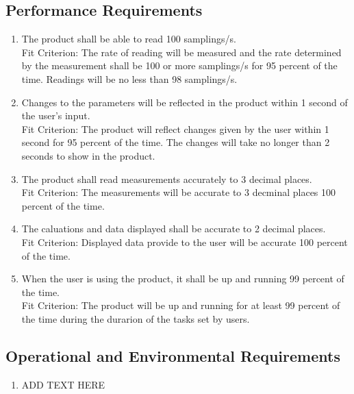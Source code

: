 \documentclass[12pt, titlepage]{article}
\begin{document}
\subsection{Performance Requirements}
\begin{adjustwidth}{2.2em}{0pt}
\begin{enumerate}[{NFR-P}1.]
  \item The product shall be able to read 100 samplings/s.\\
  Fit Criterion: The rate of reading will be measured and the rate determined by the measurement shall be 100 or more samplings/s for 95 percent of the time. 
  Readings will be no less than 98 samplings/s.
  \item Changes to the parameters will be reflected in the product within 1 second of the user's input.\\
  Fit Criterion: The product will reflect changes given by the user within 1 second for 95 percent of the time. 
  The changes will take no longer than 2 seconds to show in the product.
  \item The product shall read measurements accurately to 3 decimal places.\\
  Fit Criterion: The measurements will be accurate to 3 decminal places 100 percent of the time.
  \item The caluations and data displayed shall be accurate to 2 decimal places.\\
  Fit Criterion: Displayed data provide to the user will be accurate 100 percent of the time.
  \item When the user is using the product, it shall be up and running 99 percent of the time.\\
  Fit Criterion: The product will be up and running for at least 99 percent of the time during the durarion of the tasks set by users. 
\end{enumerate}
\end{adjustwidth}

\subsection{Operational and Environmental Requirements}
\begin{adjustwidth}{2.2em}{0pt}
\begin{enumerate}[{NFR-O}1.]
  \item ADD TEXT HERE
\end{enumerate}
\end{adjustwidth}
\end{document}
